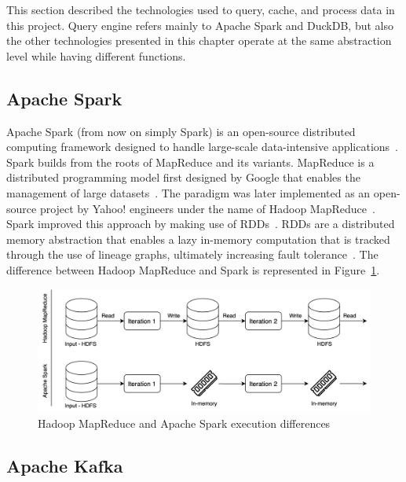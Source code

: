 This section described the technologies used to query, cache, and process data in this project. Query engine refers mainly to Apache Spark and DuckDB, but also the other technologies presented in this chapter operate at the same abstraction level while having different functions.

\subsection{Apache Spark}

Apache Spark (from now on simply Spark) is an open-source distributed computing framework designed to handle large-scale data-intensive applications~\cite{zahariaApacheSparkUnified2016}. Spark builds from the roots of MapReduce and its variants. MapReduce is a distributed programming model first designed by Google that enables the management of large datasets~\cite{dean2004mapreduce}. The paradigm was later implemented as an open-source project by Yahoo! engineers under the name of Hadoop MapReduce~\cite{borthakurHadoopDistributedFile2005}. Spark improved this approach by making use of \glspl{RDD}~\cite{Zaharia:EECS-2011-82}. \glspl{RDD} are a distributed memory abstraction that enables a lazy in-memory computation that is tracked through the use of lineage graphs, ultimately increasing fault tolerance~\cite{Zaharia:EECS-2011-82}. The difference between Hadoop MapReduce and Spark is represented in Figure~\ref{fig:MapReducevsSpark}.

\begin{figure}[!ht]
  \begin{center}
    \includegraphics[width=\textwidth]{figures/2-background/Spark_MapReduce.png}
  \end{center}
  \caption{Hadoop MapReduce and Apache Spark execution differences}
  \label{fig:MapReducevsSpark}
\end{figure}

\subsection{Apache Kafka}

